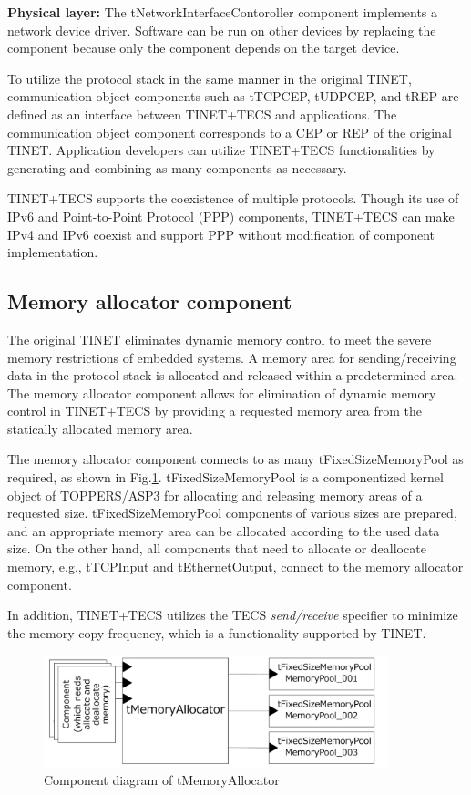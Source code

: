 \documentclass[a4j,12pt,oneside,openany,english]{jsbook}
\begin{document}
{\bf Physical layer:}
The tNetworkInterfaceContoroller component implements a network device driver.
Software can be run on other devices by replacing the component because only the component depends on the target device.

To utilize the protocol stack in the same manner in the original TINET, communication object components such as tTCPCEP, tUDPCEP, and tREP are defined as an interface between TINET+TECS and applications.
The communication object component corresponds to a CEP or REP of the original TINET.
Application developers can utilize TINET+TECS functionalities by generating and combining as many components as necessary.

TINET+TECS supports the coexistence of multiple protocols.
Though its use of IPv6 and Point-to-Point Protocol (PPP) components, TINET+TECS can make IPv4 and IPv6 coexist and support PPP without modification of component implementation.

\subsection*{Memory allocator component} 

The original TINET eliminates dynamic memory control to meet the severe memory restrictions of embedded systems.
A memory area for sending/receiving data in the protocol stack is allocated and released within a predetermined area.
The memory allocator component allows for elimination of dynamic memory control in TINET+TECS by providing a requested memory area from the statically allocated memory area.

The memory allocator component connects to as many tFixedSizeMemoryPool as required, as shown in Fig.\ref{fig:tMemoryAllocator}.
tFixedSizeMemoryPool is a componentized kernel object of TOPPERS/ASP3 for allocating and releasing memory areas of a requested size. 
tFixedSizeMemoryPool components of various sizes are prepared, and an appropriate memory area can be allocated according to the used data size.
On the other hand, all components that need to allocate or deallocate memory, e.g., tTCPInput and tEthernetOutput, connect to the memory allocator component.

In addition, TINET+TECS utilizes the TECS {\it send/receive} specifier to minimize the memory copy frequency, which is a functionality supported by TINET.

\begin{figure}[t]
    \centering
    \includegraphics[width=10cm,clip]{figure/tMemoryAllocator.pdf}
    \caption{Component diagram of tMemoryAllocator}
    \label{fig:tMemoryAllocator}
\end{figure}
\end{document}
